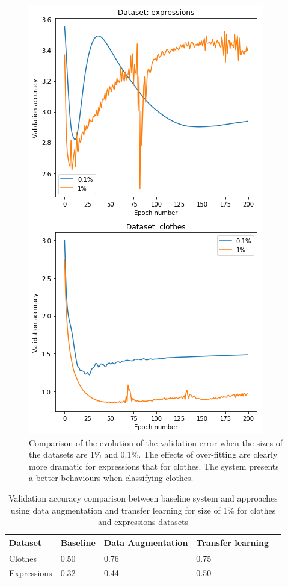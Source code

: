 \documentclass{article}
\begin{document}
\begin{figure}[tb]
    \vskip 5mm
        \begin{center}
            \includegraphics[scale=0.5]{behaviour.png}
            \caption{Comparison of the evolution of the validation error when the sizes of the datasets are 1\% and 0.1\%. The effects of over-fitting are clearly more dramatic for expressions that for clothes. The system presents a better behaviours when classifying clothes. }
            \label{fig:tf_beh}
        \end{center}
    \vskip -5mm
\end{figure}

\begin{table}[!htb]
  \centering
  \begin{tabular}{| l | l | l | l | l |}
    \hline
    \textbf{Dataset} & \textbf{Baseline} & \textbf{Data Augmentation}& \textbf{Transfer learning} \\ \hline
    Clothes & 0.50 & 0.76 & 0.75 \\ \hline
    Expressions & 0.32  & 0.44 & 0.50 \\ \hline
  \end{tabular}
  \caption{Validation accuracy comparison between baseline system and approaches using data augmentation and transfer learning for size of 1\% for clothes and expressions datasets}
  \label{tab:tf_2}
\end{table}
\end{document}
